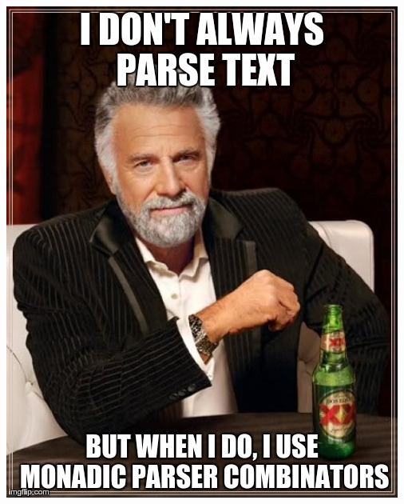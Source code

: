 \documentclass[12pt,compress,ngerman,utf8,t]{beamer}
\begin{document}
\begin{frame}
  \begin{center}
    \includegraphics[scale=0.4]{images/monadic-parser-combinators.jpeg}
  \end{center}
\end{frame}
\end{document}
